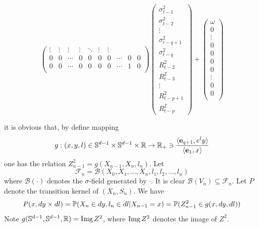 \begin{tiny}
\begin{equation*}
\begin{pmatrix}
        \vdots & \vdots & \vdots & \vdots &
        \ddots & \vdots & \vdots \\
        0 & 0 & \cdots &
        0 & 0 & 0 & 0 & \cdots & 0 & 0 \\    
        0 & 0 & \cdots &
        0 & 0 & 0 & 0 & \cdots & 1 & 0 \\    
      \end{pmatrix}
      \begin{pmatrix}
        \sigma_{t-1}^2 \\
        \sigma_{t-2}^2 \\
        \vdots \\
        \sigma_{t-q+1}^2 \\
        \sigma_{t-q}^2 \\
        R_{t-2}^2 \\
        R_{t-3}^2 \\
        \vdots \\
        R_{t-p+1}^2 \\
        R_{t-p}^2
      \end{pmatrix}
      +
      \begin{pmatrix}
        \omega \\
        0 \\
        \vdots \\
        0 \\
        0 \\
        0 \\
        0 \\
        \vdots \\
        0 \\
        0 \\
      \end{pmatrix}
  \end{equation*}
\end{tiny}
it is obvious that, by define mapping
\[
g: (x, y, l) \in \sphere^{d-1} \times \sphere^{d-1} \times \reals
\to
\reals_+ \ni {
  \inn{\vec e_{q+1}, e^l y}
  \over
  \inn{\vec e_{1}, x}
}
\]
one has the relation $Z_{n-1}^2 = g(X_{n-1}, X_n, l_n)$. Let
\[
\mathscr F_n = \mathcal B(X_0, X_1, \dots, X_n, l_1, l_2, \dots, l_n)
\]
where $\mathcal B(\cdot)$ denotes the $\sigma$-field generated by
$\cdot$. It is clear $\mathcal B(V_n) \subseteq \mathscr F_n$.
Let $P$ denote the transition kernel of $(X_n, S_n)$. We have
\[
  P(x, dy \times dl) = \P(X_n \in dy, l_n \in dl | X_{n-1} = x)
  = \P(Z_{n-1}^2 \in g(x, dy, dl))
  \]
Note $g(\sphere^{d-1}, \sphere^{d-1}, \reals) = \img Z^2$,
where $\img Z^2$ denotes the image of $Z^2$.
